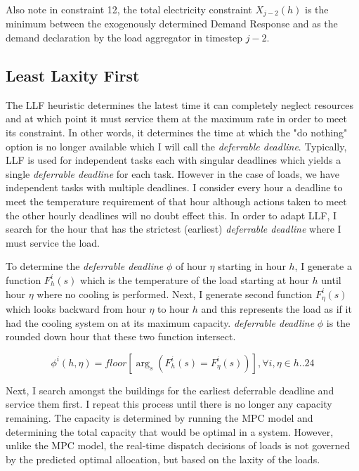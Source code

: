 \documentclass[journal]{IEEEtran}
\begin{document}
Also note in constraint 12, the total electricity constraint $X_{j-2}(h)$ is the minimum between the exogenously determined Demand Response and as the demand declaration by the load aggregator in timestep $j-2$.

\subsection{Least Laxity First}
The LLF heuristic determines the latest time it can completely neglect resources and at which point it must service them at the maximum rate in order to meet its constraint. In other words, it determines the time at which the "do nothing" option is no longer available which I will call the \textit {deferrable deadline}. Typically, LLF is used for independent tasks each with singular deadlines which yields a single \textit {deferrable deadline} for each task.
However in the case of loads, we have independent tasks with multiple deadlines. I consider every hour a deadline to meet the temperature requirement of that hour although actions taken to meet the other hourly deadlines will no doubt effect this. In order to adapt LLF, I search for the hour that has the strictest (earliest) \textit {deferrable deadline} where I must service the load.

To determine the \textit {deferrable deadline} \(\phi\) of hour \(\eta\) starting in hour \(h\), I generate a function \(F_h^i(s)\) which is the temperature of the load starting at hour \(h\) until hour \(\eta\) where no cooling is performed. Next, I generate second function \(F_{\eta}^i(s)\) which looks backward from hour \(\eta\) to hour \(h\) and this represents the load as if it had the cooling system on at its maximum capacity. \textit {deferrable deadline} \(\phi\) is the rounded down hour that these two function intersect.

\[\phi^i(h,\eta)=floor[\arg_{s} (F_h^i(s)=F_{\eta}^i(s))], \forall i, \eta \in h..24\]

Next, I search amongst the buildings for the earliest deferrable deadline and service them first. I repeat this process until there is no longer any capacity remaining. The capacity is determined by running the MPC model and determining the total capacity that would be optimal in a system. However, unlike the MPC model, the real-time dispatch decisions of loads is not governed by the predicted optimal allocation, but based on the laxity of the loads.

\[\]
\end{document}
